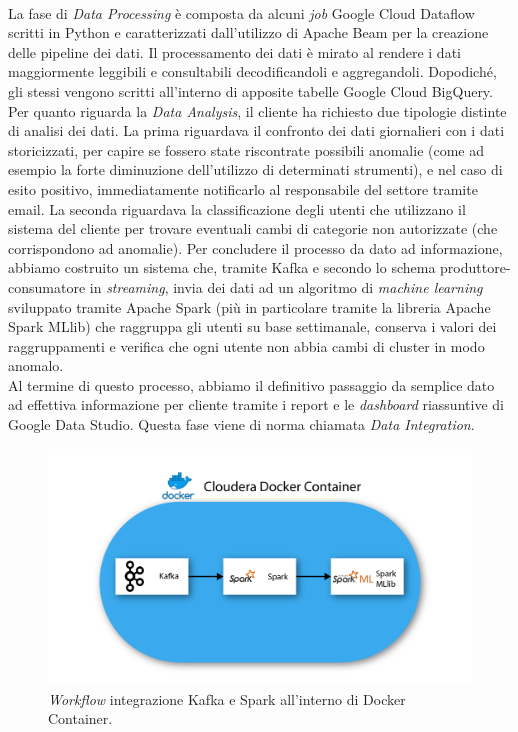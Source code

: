 \\
La fase di \emph{Data Processing} è composta da alcuni \emph{job} Google Cloud Dataflow scritti in Python e caratterizzati dall'utilizzo di Apache Beam per la creazione delle pipeline dei dati.
Il processamento dei dati è mirato al rendere i dati maggiormente leggibili e consultabili decodificandoli e aggregandoli. Dopodiché, gli stessi vengono scritti all'interno di apposite tabelle Google Cloud BigQuery.
\\
Per quanto riguarda la \emph{Data Analysis}, il cliente ha richiesto due tipologie distinte di analisi dei dati.
La prima riguardava il confronto dei dati giornalieri con i dati storicizzati, per capire se fossero state riscontrate possibili anomalie (come ad esempio la forte diminuzione dell'utilizzo di determinati strumenti), e nel caso di esito positivo, immediatamente notificarlo al responsabile del settore tramite email.
La seconda riguardava la classificazione degli utenti che utilizzano il sistema del cliente per trovare eventuali cambi di categorie non autorizzate (che corrispondono ad anomalie). Per concludere il processo da dato ad informazione, abbiamo costruito un sistema che, tramite Kafka e secondo lo schema produttore-consumatore in \emph{streaming}, invia dei dati ad un algoritmo di \emph{machine learning} sviluppato tramite Apache Spark (più in particolare tramite la libreria Apache Spark MLlib) che raggruppa gli utenti su base settimanale, conserva i valori dei raggruppamenti e verifica che ogni utente non abbia cambi di cluster in modo anomalo.\\
Al termine di questo processo, abbiamo il definitivo passaggio da semplice dato ad effettiva informazione per cliente tramite i report e le \emph{dashboard} riassuntive di Google Data Studio. Questa fase viene di norma chiamata \emph{Data Integration}.
\begin{figure}[h!]
	\centering
	\includegraphics[scale=0.5]{figures/kafka_spark}
	\caption[Workflow integrazione Kafka e Spark.]{\emph{Workflow} integrazione Kafka e Spark all'interno di Docker Container.
		\label{fig:workflow2}}
\end{figure}	
